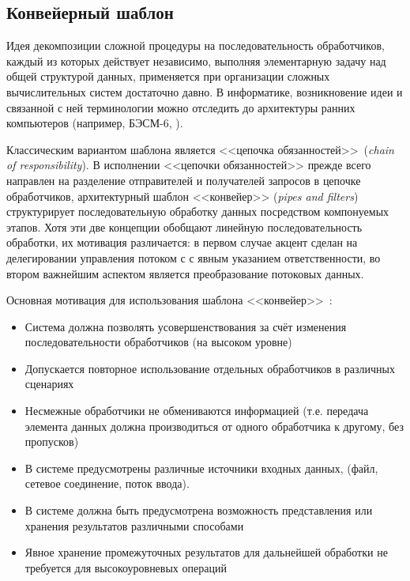 \subsection{Конвейерный шаблон}

Идея декомпозиции сложной процедуры на последовательность
обработчиков, каждый из которых действует независимо, выполняя
элементарную задачу над общей структурой данных, применяется
при организации сложных вычислительных систем достаточно давно.
В информатике, возникновение идеи и
связанной с ней терминологии можно отследить до архитектуры ранних
компьютеров (например, БЭСМ-6, \cite{smirnov-besm6}).

Классическим вариантом шаблона является
<<цепочка обязанностей>>~(\emph{chain of responsibility}).
В исполнении <<цепочки обязанностей>> прежде всего направлен на
разделение отправителей и получателей запросов в цепочке обработчиков,
архитектурный шаблон <<конвейер>> (\emph{pipes and filters})~\cite{Buschmann-patterns-vol1}
структурирует последовательную обработку данных посредством компонуемых
этапов. Хотя эти две концепции обобщают линейную последовательность
обработки, их мотивация различается:
в первом случае акцент сделан на делегировании управления потоком с
с явным указанием ответственности,
во втором важнейшим аспектом является преобразование потоковых данных.

Основная мотивация для использования шаблона <<конвейер>>~\cite{Buschmann-patterns-vol1}:

\begin{itemize}
    \item Система должна позволять усовершенствования за счёт
    изменения последовательности обработчиков (на высоком уровне)
    \item Допускается повторное использование отдельных обработчиков
    в различных сценариях
    \item Несмежные обработчики не обмениваются информацией (т.е.
    передача элемента данных должна производиться от одного обработчика
    к другому, без пропусков)
    \item В системе предусмотрены различные источники входных данных,
    (файл, сетевое соединение, поток ввода).
    \item В системе должна быть предусмотрена возможность представления
    или хранения результатов различными способами
    \item Явное хранение промежуточных результатов для дальнейшей
    обработки не требуется для высокоуровневых операций
\end{itemize}

